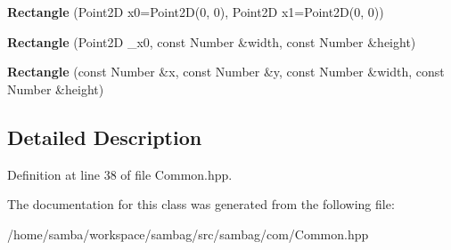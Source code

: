 \begin{DoxyCompactItemize}
\item 
\hypertarget{classsambag_1_1com_1_1_rectangle_ae7c887c3789dfb301923f7bede73c529}{
{\bfseries Rectangle} (Point2D x0=Point2D(0, 0), Point2D x1=Point2D(0, 0))}
\label{classsambag_1_1com_1_1_rectangle_ae7c887c3789dfb301923f7bede73c529}

\item 
\hypertarget{classsambag_1_1com_1_1_rectangle_a4fc6e60c0d700ea737b8eca53c827f03}{
{\bfseries Rectangle} (Point2D \_\-x0, const Number \&width, const Number \&height)}
\label{classsambag_1_1com_1_1_rectangle_a4fc6e60c0d700ea737b8eca53c827f03}

\item 
\hypertarget{classsambag_1_1com_1_1_rectangle_ae517cb9d51d100205e822325fdd2367d}{
{\bfseries Rectangle} (const Number \&x, const Number \&y, const Number \&width, const Number \&height)}
\label{classsambag_1_1com_1_1_rectangle_ae517cb9d51d100205e822325fdd2367d}

\end{DoxyCompactItemize}


\subsection{Detailed Description}


Definition at line 38 of file Common.hpp.



The documentation for this class was generated from the following file:\begin{DoxyCompactItemize}
\item 
/home/samba/workspace/sambag/src/sambag/com/Common.hpp\end{DoxyCompactItemize}
